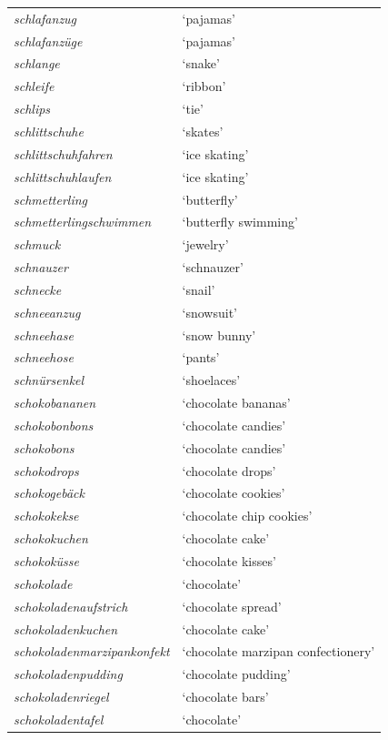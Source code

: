\begin{longtable}{ll}
\textit{schlafanzug} & `pajamas' \\
\textit{schlafanzüge} & `pajamas' \\
\textit{schlange} & `snake' \\
\textit{schleife} & `ribbon' \\
\textit{schlips} & `tie' \\
\textit{schlittschuhe} & `skates' \\
\textit{schlittschuhfahren} & `ice skating' \\
\textit{schlittschuhlaufen} & `ice skating' \\
\textit{schmetterling} & `butterfly' \\
\textit{schmetterlingschwimmen} & `butterfly swimming' \\
\textit{schmuck} & `jewelry' \\
\textit{schnauzer} & `schnauzer' \\
\textit{schnecke} & `snail' \\
\textit{schneeanzug} & `snowsuit' \\
\textit{schneehase} & `snow bunny' \\
\textit{schneehose} & `pants' \\
\textit{schnürsenkel} & `shoelaces' \\
\textit{schokobananen} & `chocolate bananas' \\
\textit{schokobonbons} & `chocolate candies' \\
\textit{schokobons} & `chocolate candies' \\
\textit{schokodrops} & `chocolate drops' \\
\textit{schokogebäck} & `chocolate cookies' \\
\textit{schokokekse} & `chocolate chip cookies' \\
\textit{schokokuchen} & `chocolate cake' \\
\textit{schokoküsse} & `chocolate kisses' \\
\textit{schokolade} & `chocolate' \\
\textit{schokoladenaufstrich} & `chocolate spread' \\
\textit{schokoladenkuchen} & `chocolate cake' \\
\textit{schokoladenmarzipankonfekt} & `chocolate marzipan confectionery' \\
\textit{schokoladenpudding} & `chocolate pudding' \\
\textit{schokoladenriegel} & `chocolate bars' \\
\textit{schokoladentafel} & `chocolate' \\

\end{longtable}

